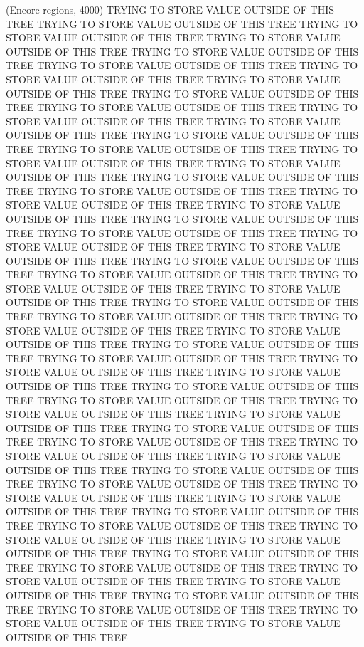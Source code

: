 (Encore regions, 4000)
TRYING TO STORE VALUE OUTSIDE OF THIS TREE
TRYING TO STORE VALUE OUTSIDE OF THIS TREE
TRYING TO STORE VALUE OUTSIDE OF THIS TREE
TRYING TO STORE VALUE OUTSIDE OF THIS TREE
TRYING TO STORE VALUE OUTSIDE OF THIS TREE
TRYING TO STORE VALUE OUTSIDE OF THIS TREE
TRYING TO STORE VALUE OUTSIDE OF THIS TREE
TRYING TO STORE VALUE OUTSIDE OF THIS TREE
TRYING TO STORE VALUE OUTSIDE OF THIS TREE
TRYING TO STORE VALUE OUTSIDE OF THIS TREE
TRYING TO STORE VALUE OUTSIDE OF THIS TREE
TRYING TO STORE VALUE OUTSIDE OF THIS TREE
TRYING TO STORE VALUE OUTSIDE OF THIS TREE
TRYING TO STORE VALUE OUTSIDE OF THIS TREE
TRYING TO STORE VALUE OUTSIDE OF THIS TREE
TRYING TO STORE VALUE OUTSIDE OF THIS TREE
TRYING TO STORE VALUE OUTSIDE OF THIS TREE
TRYING TO STORE VALUE OUTSIDE OF THIS TREE
TRYING TO STORE VALUE OUTSIDE OF THIS TREE
TRYING TO STORE VALUE OUTSIDE OF THIS TREE
TRYING TO STORE VALUE OUTSIDE OF THIS TREE
TRYING TO STORE VALUE OUTSIDE OF THIS TREE
TRYING TO STORE VALUE OUTSIDE OF THIS TREE
TRYING TO STORE VALUE OUTSIDE OF THIS TREE
TRYING TO STORE VALUE OUTSIDE OF THIS TREE
TRYING TO STORE VALUE OUTSIDE OF THIS TREE
TRYING TO STORE VALUE OUTSIDE OF THIS TREE
TRYING TO STORE VALUE OUTSIDE OF THIS TREE
TRYING TO STORE VALUE OUTSIDE OF THIS TREE
TRYING TO STORE VALUE OUTSIDE OF THIS TREE
TRYING TO STORE VALUE OUTSIDE OF THIS TREE
TRYING TO STORE VALUE OUTSIDE OF THIS TREE
TRYING TO STORE VALUE OUTSIDE OF THIS TREE
TRYING TO STORE VALUE OUTSIDE OF THIS TREE
TRYING TO STORE VALUE OUTSIDE OF THIS TREE
TRYING TO STORE VALUE OUTSIDE OF THIS TREE
TRYING TO STORE VALUE OUTSIDE OF THIS TREE
TRYING TO STORE VALUE OUTSIDE OF THIS TREE
TRYING TO STORE VALUE OUTSIDE OF THIS TREE
TRYING TO STORE VALUE OUTSIDE OF THIS TREE
TRYING TO STORE VALUE OUTSIDE OF THIS TREE
TRYING TO STORE VALUE OUTSIDE OF THIS TREE
TRYING TO STORE VALUE OUTSIDE OF THIS TREE
TRYING TO STORE VALUE OUTSIDE OF THIS TREE
TRYING TO STORE VALUE OUTSIDE OF THIS TREE
TRYING TO STORE VALUE OUTSIDE OF THIS TREE
TRYING TO STORE VALUE OUTSIDE OF THIS TREE
TRYING TO STORE VALUE OUTSIDE OF THIS TREE
TRYING TO STORE VALUE OUTSIDE OF THIS TREE
TRYING TO STORE VALUE OUTSIDE OF THIS TREE
TRYING TO STORE VALUE OUTSIDE OF THIS TREE
TRYING TO STORE VALUE OUTSIDE OF THIS TREE
TRYING TO STORE VALUE OUTSIDE OF THIS TREE
TRYING TO STORE VALUE OUTSIDE OF THIS TREE
TRYING TO STORE VALUE OUTSIDE OF THIS TREE
TRYING TO STORE VALUE OUTSIDE OF THIS TREE
TRYING TO STORE VALUE OUTSIDE OF THIS TREE
TRYING TO STORE VALUE OUTSIDE OF THIS TREE
TRYING TO STORE VALUE OUTSIDE OF THIS TREE
TRYING TO STORE VALUE OUTSIDE OF THIS TREE
